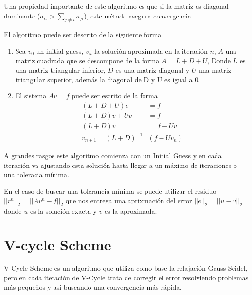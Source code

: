 \documentclass[letter, 10pt]{article}
\begin{document}
Una propiedad importante de este algoritmo es que si la matriz es diagonal dominante ($a_{ii} >  \sum_{j\neq i} a_{ji}$), este método asegura convergencia.

El algoritmo puede ser descrito de la siguiente forma:
\begin{enumerate}
    \item Sea $v_0$ un initial guess, $v_n$ la solución aproximada en la iteración $n$,  $A$ una matriz cuadrada que se descompone de la forma $A = L + D + U$, Donde $L$ es una matriz triangular inferior, $D$ es una matriz diagonal y $U$ una matriz triangular superior, además la diagonal de D y U es igual a 0.
    \item El sistema $Av = f$ puede ser escrito de la forma
    \begin{align}
        (L + D + U)v &= f \\
        (L+D) v + Uv &= f   \\
        (L+D)v &= f - Uv \\
        v_{n+1} = (L+D)^{-1} &(f - Uv_{n})
    \end{align}
    
\end{enumerate}

A grandes rasgos este algoritmo comienza con un Initial Guess y en cada iteración va ajustando esta solución hasta llegar a un máximo de iteraciones o una toleracia mínima.

En el caso de buscar una tolerancia mínima se puede utilizar el residuo $||r^n||_2 = ||Av^n - f||_2$ que nos entrega una aprixmación del error $||e||_2 = ||u-v||_2$ donde $u$ es la solución exacta y $v$ es la aproximada. 

\section{V-cycle Scheme}

V-Cycle Scheme \cite{briggs2000multigrid} es un algoritmo que utiliza como base la relajación Gauss Seidel, pero en cada iteración de V-Cycle trata de corregir el error resolviendo problemas más pequeños y así buscando una convergencia más rápida.
\end{document}
